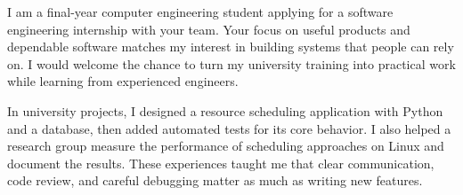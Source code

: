 I am a final-year computer engineering student applying for a software engineering internship with your team. Your focus on useful products and dependable software matches my interest in building systems that people can rely on. I would welcome the chance to turn my university training into practical work while learning from experienced engineers.

In university projects, I designed a resource scheduling application with Python and a database, then added automated tests for its core behavior. I also helped a research group measure the performance of scheduling approaches on Linux and document the results. These experiences taught me that clear communication, code review, and careful debugging matter as much as writing new features.
